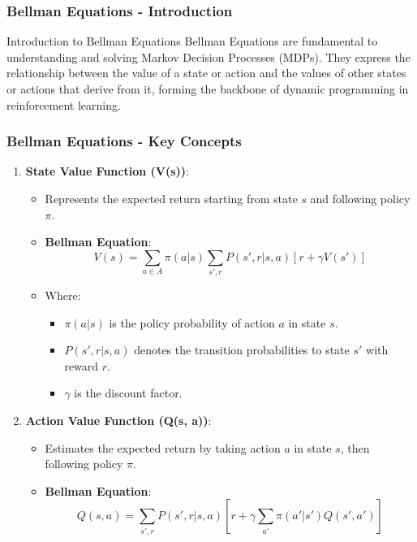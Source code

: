 \documentclass[aspectratio=169]{beamer}
\begin{document}
\begin{frame}[fragile]
    \frametitle{Bellman Equations - Introduction}
    \begin{block}{Introduction to Bellman Equations}
        Bellman Equations are fundamental to understanding and solving Markov Decision Processes (MDPs). They express the relationship between the value of a state or action and the values of other states or actions that derive from it, forming the backbone of dynamic programming in reinforcement learning.
    \end{block}
\end{frame}

\begin{frame}[fragile]
    \frametitle{Bellman Equations - Key Concepts}
    \begin{enumerate}
        \item \textbf{State Value Function (V(s))}:
        \begin{itemize}
            \item Represents the expected return starting from state \(s\) and following policy \(\pi\).
            \item \textbf{Bellman Equation}:
            \begin{equation}
                V(s) = \sum_{a \in A} \pi(a|s) \sum_{s', r} P(s', r | s, a) \left[ r + \gamma V(s') \right]
            \end{equation}
            \item Where:
            \begin{itemize}
                \item \(\pi(a|s)\) is the policy probability of action \(a\) in state \(s\).
                \item \(P(s', r | s, a)\) denotes the transition probabilities to state \(s'\) with reward \(r\).
                \item \(\gamma\) is the discount factor.
            \end{itemize}
        \end{itemize}

        \item \textbf{Action Value Function (Q(s, a))}:
        \begin{itemize}
            \item Estimates the expected return by taking action \(a\) in state \(s\), then following policy \(\pi\).
            \item \textbf{Bellman Equation}:
            \begin{equation}
                Q(s, a) = \sum_{s', r} P(s', r | s, a) \left[ r + \gamma \sum_{a'} \pi(a'|s') Q(s', a') \right]
            \end{equation}
        \end{itemize}
    \end{enumerate}
\end{frame}
\end{document}
